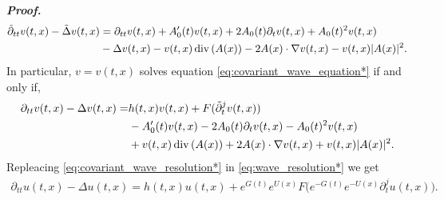\documentclass[11pt,reqno]{amsart}
\theoremstyle{definition}
\numberwithin{equation}{section}
\renewenvironment{proof}{\smallskip\noindent\emph{\textbf{Proof.}}%
  \hspace{1pt}}{\hspace{-5pt}{\nobreak\quad\nobreak\hfill\nobreak%
    $\square$\vspace{2pt}\par}\smallskip\goodbreak}
\renewcommand{\div}{\mathinner{\mathop{{\rm div}}}}
\newcommand\red[1]{{\color{red}#1}}
\newcommand\blue[1]{{\color{blue}#1}}
\newcommand\magenta[1]{{\color{magenta}#1}}
\newcommand\olive[1]{{\color{olive}#1}}
\newcommand\brown[1]{{\color{brown}#1}}
\newcommand\gray[1]{{\color{gray}#1}}
\begin{document}
\begin{proof}
\begin{equation*}
\begin{aligned}
\tilde \partial_{tt}v(t,x)-\tilde \Delta v(t,x)&= \partial_{tt}v(t,x)+ A_0'(t)v(t,x)+2 A_0(t)\partial_t v(t,x)+ A_0(t)^2 v(t,x) \\
% 
& -\Delta v(t,x)-v(t,x)\div(A(x))-2A (x)\cdot \nabla v(t,x)-v(t,x)|A (x)|^2 .
\end{aligned}
\end{equation*}
%
In particular, $v=v(t,x)$ solves equation \eqref{eq:covariant_wave_equation*} if and only if, 
%
\begin{equation}
\label{eq:covariant_wave_resolution*}
\begin{aligned}
\partial_{tt}v(t,x)-\Delta v(t,x)=&h(t,x)v(t,x)+F(\tilde \partial_t^j v(t,x))\\
&- A_0'(t)v(t,x)-2 A_0(t)\partial_t v(t,x)- A_0(t)^2 v(t,x) \\
% 
&+v(t,x)\div(A(x))+2A(x)\cdot \nabla v(t,x)+v(t,x)|A(x)|^2.
\end{aligned}
\end{equation}
%
Repleacing \eqref{eq:covariant_wave_resolution*} in \eqref{eq:wave_resolution*} we get
%
\begin{equation*}
\begin{aligned}
\partial_{tt}u(t,x) - \Delta u(t,x)=
%
%
%
h(t,x)u(t,x)+e^{G(t)} e^{U(x)}F\Big(e^{-G(t)} e^{-U(x)}\partial_t^j u(t,x)\Big).
\end{aligned}
\end{equation*}
%
\end{proof}
\end{document}
